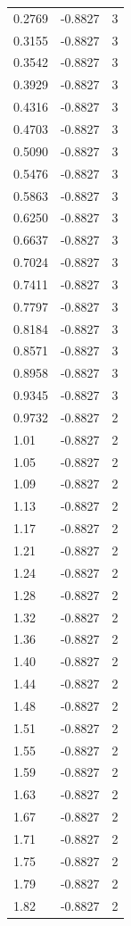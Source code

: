 \begin{longtable}{lrr}
  0.2769 & -0.8827 & 3 \\
  0.3155 & -0.8827 & 3 \\
  0.3542 & -0.8827 & 3 \\
  0.3929 & -0.8827 & 3 \\
  0.4316 & -0.8827 & 3 \\
  0.4703 & -0.8827 & 3 \\
  0.5090 & -0.8827 & 3 \\
  0.5476 & -0.8827 & 3 \\
  0.5863 & -0.8827 & 3 \\
  0.6250 & -0.8827 & 3 \\
  0.6637 & -0.8827 & 3 \\
  0.7024 & -0.8827 & 3 \\
  0.7411 & -0.8827 & 3 \\
  0.7797 & -0.8827 & 3 \\
  0.8184 & -0.8827 & 3 \\
  0.8571 & -0.8827 & 3 \\
  0.8958 & -0.8827 & 3 \\
  0.9345 & -0.8827 & 3 \\
  0.9732 & -0.8827 & 2 \\
  1.01 & -0.8827 & 2 \\
  1.05 & -0.8827 & 2 \\
  1.09 & -0.8827 & 2 \\
  1.13 & -0.8827 & 2 \\
  1.17 & -0.8827 & 2 \\
  1.21 & -0.8827 & 2 \\
  1.24 & -0.8827 & 2 \\
  1.28 & -0.8827 & 2 \\
  1.32 & -0.8827 & 2 \\
  1.36 & -0.8827 & 2 \\
  1.40 & -0.8827 & 2 \\
  1.44 & -0.8827 & 2 \\
  1.48 & -0.8827 & 2 \\
  1.51 & -0.8827 & 2 \\
  1.55 & -0.8827 & 2 \\
  1.59 & -0.8827 & 2 \\
  1.63 & -0.8827 & 2 \\
  1.67 & -0.8827 & 2 \\
  1.71 & -0.8827 & 2 \\
  1.75 & -0.8827 & 2 \\
  1.79 & -0.8827 & 2 \\
  1.82 & -0.8827 & 2 \\

\end{longtable}
